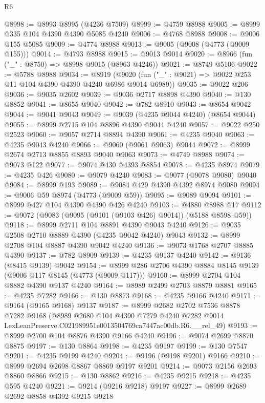\begin{lexlean}{R6}
\begin{coremodule}
@8998 := @8993 @8995 (@4236 @7509)
@8999 := @4759 @8988
@9005 := @8999 @335 @104 @4390 @4390 @5085 @4240
@9006 := @4768 @8988
@9008 := @9006 @155 @5085
@9009 := @4774 @8988
@9013 := @9005 (@9008 (@4773 (@9009 @155)))
@9014 := @4793 @8988
@9015 := @9013 @9014
@9020 := @8966 (fun ("_" : @8750) => @8998 @9015 (@8963 @4246))
@9021 := @8749 @5106
@9022 := @5788 @8988
@9034 := @8919
    (@9020 (fun ("_" : @9021) => @9022 @253 @11 @104 @4390 @4390 @4240 @6986 @9014 @6989))
@9035 := @9022 @206
@9036 := @9035 @2602
@9039 := @9036 @2717 @8898 @4390
@9040 := @130 @8852
@9041 := @8655 @9040
@9042 := @782 @8910
@9043 := @8654 @9042
@9044 := @9041 @9043
@9049 := @9039 (@4235 @9044 @4240) (@8654 @9044)
@9055 := @8999 @2715 @104 @8896 @4390 @9044 @4240
@9057 := @9022 @250 @2523
@9060 := @9057 @2714 @8894 @4390
@9061 := @4235 @9040
@9063 := @4235 @9043 @4240
@9066 := @9060 (@9061 @9063) @9044
@9072 := @8999 @2674 @2713 @8855 @8893 @9040 @9063
@9073 := @4749 @8988
@9074 := @9073 @122
@9077 := @9074 @430 @4393 @8854
@9078 := @4235 @8974
@9079 := @4235 @426
@9080 := @9079 @4240
@9083 := @9077 (@9078 @9080) @9040
@9084 := @8999 @193
@9089 := @9084 @429 @4390 @4392 @8974 @9080
@9094 := @9006 @59 @8974 (@4773 (@9009 @59))
@9095 := @9089 @9094
@9101 := @8999 @427 @104 @4390 @4390 @426 @4240
@9103 := @4880 @8988 @17
@9112 := @9072 (@9083 (@9095 (@9101 (@9103 @426) @9014)) (@5188 @8598 @59))
@9118 := @8999 @2711 @104 @8891 @4390 @9043 @4240
@9126 := @9035 @2508 @2710 @8889 @4390 (@4235 @9042 @4240) @9043
@9132 := @8999 @2708 @104 @8887 @4390 @9042 @4240
@9136 := @9073 @1768 @2707 @8885 @4390
@9137 := @782 @8909
@9139 := @4235 @9137 @4240
@9142 := @9136 (@8415 @9139) @9042
@9154 := @8999 @286 @2706 @4390 @8884 @8145 @9139 (@9006 @117 @8145 (@4773 (@9009 @117)))
@9160 := @8999 @2704 @104 @8882 @4390 @9137 @4240
@9164 := @8989 @2499 @2703 @8879 @8881
@9165 := @4235 @7282
@9166 := @130 @8873
@9168 := @4235 @9166 @4240
@9171 := @9164 (@9165 @9168) @9137
@9187 := @8999
    @2682
    @2702
    @7536
    @8878
    @7282
    @9168
    (@8989
      @2680
      @104
      @4390
      @7279
      @4240
      @7282
      @9014
      LexLeanPreserve.C021989951e0013504769ca7447ac00db.R6.__rel_49)
@9193 := @8999 @2700 @104 @8876 @4390 @9166 @4240
@9196 := @9074 @2699 @8870 @8875
@9197 := @130 @8864
@9198 := @4235 @9197
@9199 := @130 @7547
@9201 := @4235 @9199 @4240
@9204 := @9196 (@9198 @9201) @9166
@9210 := @8999 @2694 @2698 @8867 @8869 @9197 @9201
@9214 := @9073 @2156 @2693 @8860 @8866
@9215 := @130 @8862
@9216 := @4235 @9215
@9218 := @4235 @595 @4240
@9221 := @9214 (@9216 @9218) @9197
@9227 := @8999 @2689 @2692 @8858 @4392 @9215 @9218

\end{coremodule}
\end{lexlean}
